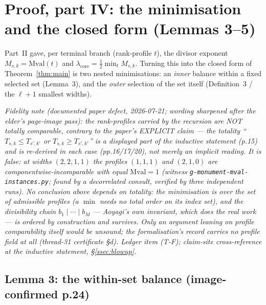 \documentclass[11pt]{article}
\theoremstyle{plain}
\theoremstyle{definition}
\theoremstyle{remark}
\newcommand{\rlct}{\lambda}          %
\newcommand{\Mval}{\mathrm{Mval}}
\begin{document}
\section{Proof, part IV: the minimisation and the closed form (Lemmas 3--5)}
\label{sec:minimisation}

Part~II gave, per terminal branch (rank-profile $t$), the divisor exponent $M_{s,k}=\Mval(t)$ and
$\rlct_{\mathrm{core}}=\tfrac12\min_t M_{s,k}$. Turning this into the closed form of
Theorem~\ref{thm:main} is two nested minimisations: an \emph{inner} balance within a fixed selected set
(Lemma~3), and the \emph{outer} selection of the set itself (Definition~3 / the $\ell+1$ smallest widths).

\emph{Fidelity note (documented paper defect, 2026-07-21; wording sharpened after the elder's page-image
pass): the rank-profiles carried by the recursion are NOT totally comparable, contrary to the paper's
EXPLICIT claim --- the totality ``$T_{s,k}\le T_{s',k'}$ or $T_{s,k}\ge T_{s',k'}$'' is a displayed part
of the inductive statement (p.15) and is re-derived in each case (pp.16/17/20), not merely an implicit
reading. It is false: at widths $(2,2,1,1)$ the profiles $(1,1,1)$ and $(2,1,0)$ are
componentwise-incomparable with equal $\Mval=1$ (witness \texttt{g-monument-mval-instances.py}; found by
a decorrelated consult, verified by three independent runs). No conclusion above depends on totality: the
minimisation is over the \emph{set} of admissible profiles (a $\min$ needs no total order on its index
set), and the divisibility chain $b_1\mid\cdots\mid b_M$ --- Aoyagi's own invariant, which does the real
work --- is ordered by construction and survives. Only an argument leaning on profile comparability
itself would be unsound; the formalisation's record carries no profile field at all (thread-31
certificate \S d). Ledger item (T-F); claim-site cross-reference at the inductive statement,
\S\ref{ssec:blowup}.}

\subsection{Lemma 3: the within-set balance (image-confirmed p.24)}\label{ssec:lemma3}
\end{document}
